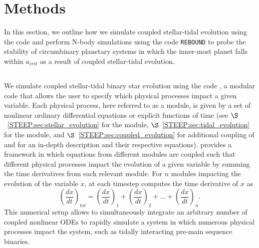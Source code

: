

\section{Methods} \label{STEEP:sec:methods}

In this section, we outline how we simulate coupled stellar-tidal evolution using the code \vplanet \citep[][Barnes \textit{et al.}, \textit{in prep}]{Barnes2016} and perform N-body simulations using the code \texttt{REBOUND} \citep{Rein2012} to probe the stability of circumbinary planetary systems in which the inner-most planet falls within $a_{crit}$ as a result of coupled stellar-tidal evolution.


\subsection{\vplanet} \label{STEEP:sec:vplanet}

We simulate coupled stellar-tidal binary star evolution using the code \vplanet, a modular code that allows the user to specify which physical processes impact a given variable.  Each physical process, here referred to as a module, is given by a set of nonlinear ordinary differential equations or explicit functions of time (see $\S$~\ref{STEEP:sec:stellar_evolution} for the \stellar module, $\S$~\ref{STEEP:sec:tidal_evolution} for the \eqtide module, and $\S$~\ref{STEEP:sec:coupled_evolution} for additional coupling of \stellar and \eqtide for an in-depth description and their respective equations).  \vplanet provides a framework in which equations from different modules are coupled such that different physical processes impact the evolution of a given variable by summing the time derivatives from each relevant module.  For $n$ modules impacting the evolution of the variable $x$, at each timestep \vplanet computes the time derivative of $x$ as
\begin{equation} \label{STEEP:eqn:vplanet_dxdt}
\left( \frac{dx}{dt} \right)_{tot} = \left( \frac{dx}{dt} \right)_{1} + \left( \frac{dx}{dt} \right)_{2} + ... + \left( \frac{dx}{dt} \right)_{n}.
\end{equation}
This numerical setup allows \vplanet to simultaneously integrate an arbitrary number of coupled nonlinear ODEs to rapidly simulate a system in which numerous physical processes impact the system, such as tidally interacting pre-main sequence binaries.

